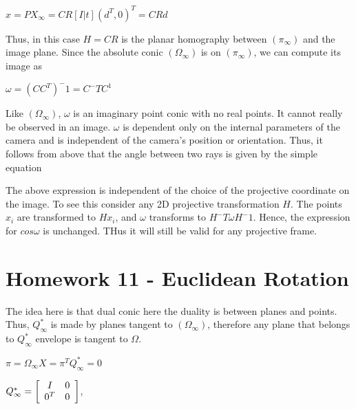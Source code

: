 \documentclass[]{article}
\begin{document}
\vspace{0.5em}

\centerline {
	$x = PX_ \infty = CR[I|t](d^T, 0)^T = CRd$
}

\vspace{0.5em}

Thus, in this case $H = CR$ is the planar homography between $(\pi _ \infty)$ and the image plane. Since the absolute conic $(\Omega _ \infty)$ is on $(\pi _ \infty)$, we can compute its image as 

\vspace{0.5em}

\centerline {
	$\omega = (CC^T)^-1 = C^-TC^1$
}
 
Like  $(\Omega _ \infty)$, $\omega$ is an imaginary point conic with no real points. It cannot really be observed in an image. $\omega$ is dependent only on the internal parameters of the camera and is independent of the camera's position or orientation. Thus,
it follows from above that the angle between two rays is given by the simple equation 

The above expression is independent of the choice of the projective coordinate on the image. To see this consider any 2D projective transformation $H$. The points $x_i$ are transformed to $Hx_i$, and $\omega$ transforms to $H^-T \omega H^-1$. Hence, the expression for $cos \omega$ is unchanged. THus it will still be valid for any projective frame. 


\section{Homework 11 - Euclidean Rotation}

The idea here is that dual conic here the duality is between planes and points. Thus, $Q_ \infty ^*$ is made by planes tangent to $(\Omega _ \infty)$, therefore any plane that belongs to $Q_ \infty ^*$ envelope is tangent to $\Omega$. 

\vspace{0.5em}

\centerline {
	$\pi = \Omega _ \infty X = \pi ^TQ_ \infty ^* = 0$ 
}

\vspace{0.5em}

\centerline {
	$Q_ \infty ^* = \left[ {\begin{array}{*{20}c}
		I & 0 \\
		0^T & 0   
		\end{array} } \right]$,
}

\vspace{0.5em}
\end{document}
